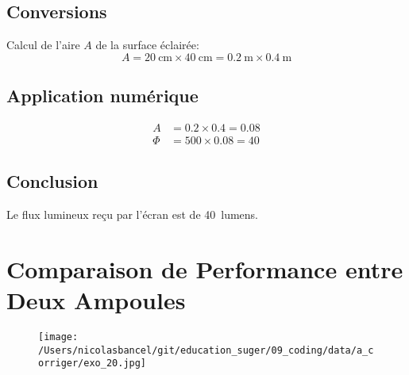 \documentclass[answers]{exam}
\begin{document}
\begin{solution}
\begin{questions}
\subsection*{Conversions}
Calcul de l'aire \(A\) de la surface éclairée:
\[
A = \SI{20}{\centi\meter} \times \SI{40}{\centi\meter} = \SI{0.2}{\meter} \times \SI{0.4}{\meter}
\]

\subsection*{Application numérique}
\begin{align*}
A &= 0.2 \times 0.4 = 0.08 \\
\Phi &= 500 \times 0.08 = 40
\end{align*}

\subsection*{Conclusion}
Le flux lumineux reçu par l'écran est de \SI{40}{lumens}.
\end{questions}
\end{solution}



\section*{Comparaison de Performance entre Deux Ampoules}

    \begin{figure}[H]
      \centering
      \texttt{[image: /Users/nicolasbancel/git/education\_suger/09\_coding/data/a\_corriger/exo\_20.jpg]}
      \captionsetup{labelformat=empty}
    \end{figure}
\end{document}
